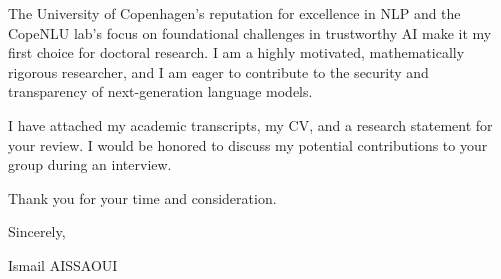 \documentclass[11pt,a4paper]{article}
\begin{document}
The University of Copenhagen's reputation for excellence in NLP and the CopeNLU lab's focus on foundational challenges in trustworthy AI make it my first choice for doctoral research. I am a highly motivated, mathematically rigorous researcher, and I am eager to contribute to the security and transparency of next-generation language models.

I have attached my academic transcripts, my CV, and a research statement for your review. I would be honored to discuss my potential contributions to your group during an interview.

Thank you for your time and consideration.

Sincerely,

\bigskip

\noindent Ismail AISSAOUI
\end{document}
